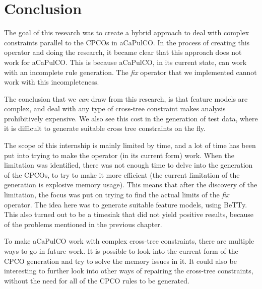 \chapter{Conclusion}\label{ch:conclusion}
The goal of this research was to create a hybrid approach to deal with
complex constraints parallel to the CPCOs in aCaPulCO. In the process of
creating this operator and doing the research, it became clear that this
approach does not work for aCaPulCO. This is because aCaPulCO, in its
current state, can work with an incomplete rule generation. The \emph{fix}
operator that we implemented cannot work with this incompleteness.

The conclusion that we \emph{can} draw from this research, is that feature
models are complex, and deal with any type of cross-tree constraint
makes analysis prohibitively expensive. We also see this cost in the
generation of test data, where it is difficult to generate suitable cross
tree constraints on the fly. 

The scope of this internship is mainly limited by time, and a lot of time
has been put into trying to make the operator (in its current form) work.
When the limitation was identified, there was not enough time to delve into
the generation of the CPCOs, to try to make it more efficient (the current
limitation of the generation is explosive memory usage). This means that
after the discovery of the limitation, the focus was put on trying to find
the actual limits of the \emph{fix} operator. The idea here was to generate
suitable feature models, using BeTTy. This also turned out to be a timesink 
that did not yield positive results, because of the problems mentioned in
the previous chapter.

To make aCaPulCO work with complex cross-tree constraints, there are multiple
ways to go in future work. It is possible to look into the current form of
the CPCO generation and try to solve the memory issues in it. It could also
be interesting to further look into other ways of repairing the cross-tree
constraints, without the need for all of the CPCO rules to be generated. 
